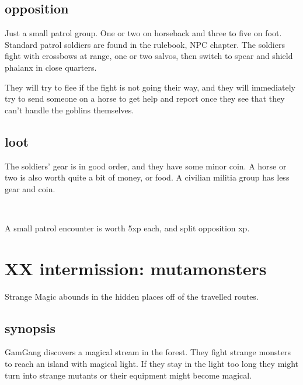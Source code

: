 \subsection*{opposition}

Just a small patrol group. One or two on horseback and three to five on foot. Standard patrol soldiers are found in the rulebook, NPC chapter. The soldiers fight with crossbows at range, one or two salvos, then switch to spear and shield phalanx in close quarters.

They will try to flee if the fight is not going their way, and they will immediately try to send someone on a horse to get help and report once they see that they can't handle the goblins themselves.


\subsection*{loot}

The soldiers' gear is in good order, and they have some minor coin. A horse or two is also worth quite a bit of money, or food. A civilian militia group has less gear and coin.

\

A small patrol encounter is worth 5xp each, and split opposition xp.










\clearpage
\section*{XX intermission: mutamonsters}
\label{xxmutamonsters}

Strange Magic abounds in the hidden places off of the travelled routes.


\subsection*{synopsis}
GamGang discovers a magical stream in the forest. They fight strange monsters to reach an island with magical light. If they stay in the light too long they might turn into strange mutants or their equipment might become magical.


